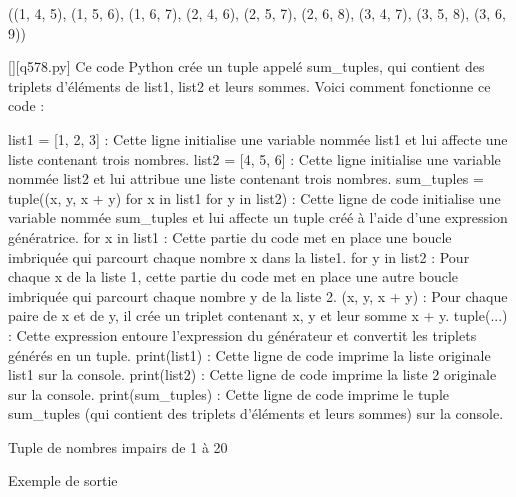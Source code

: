 ((1, 4, 5), (1, 5, 6), (1, 6, 7), (2, 4, 6), (2, 5, 7), (2, 6, 8), (3, 4, 7), (3, 5, 8), (3, 6, 9))
        \par
        \begin{solution}
            \renewcommand{\nomfichier}{q578.py}
            \pythonfile{\chemincode \nomfichier}[][\nomfichier]
            Ce code Python crée un tuple appelé sum_tuples, qui contient des triplets d'éléments de list1, list2 et leurs sommes. Voici comment fonctionne ce code :

    list1 = [1, 2, 3] : Cette ligne initialise une variable nommée list1 et lui affecte une liste contenant trois nombres.
    list2 = [4, 5, 6] : Cette ligne initialise une variable nommée list2 et lui attribue une liste contenant trois nombres.
    sum_tuples = tuple((x, y, x + y) for x in list1 for y in list2) : Cette ligne de code initialise une variable nommée sum_tuples et lui affecte un tuple créé à l'aide d'une expression génératrice.
        for x in list1 : Cette partie du code met en place une boucle imbriquée qui parcourt chaque nombre x dans la liste1.
        for y in list2 : Pour chaque x de la liste 1, cette partie du code met en place une autre boucle imbriquée qui parcourt chaque nombre y de la liste 2.
        (x, y, x + y) : Pour chaque paire de x et de y, il crée un triplet contenant x, y et leur somme x + y.
        tuple(...) : Cette expression entoure l'expression du générateur et convertit les triplets générés en un tuple.
    print(list1) : Cette ligne de code imprime la liste originale list1 sur la console.
    print(list2) : Cette ligne de code imprime la liste 2 originale sur la console.
    print(sum_tuples) : Cette ligne de code imprime le tuple sum_tuples (qui contient des triplets d'éléments et leurs sommes) sur la console.
        \end{solution}
        

        \question
        Tuple de nombres impairs de 1 à 20

Exemple de sortie

